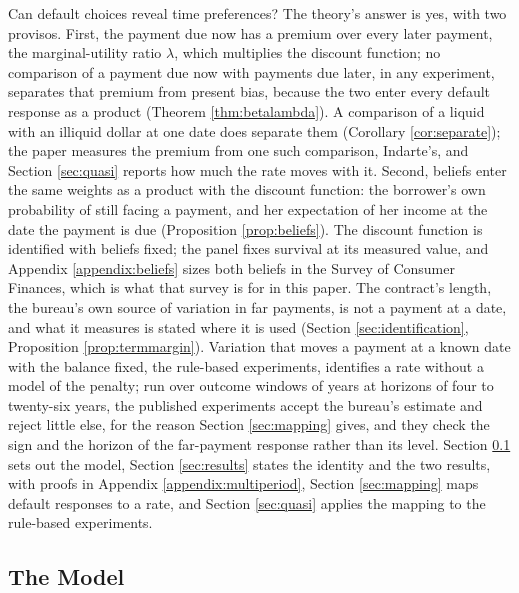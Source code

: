 Can default choices reveal time preferences? The theory's answer is yes, with two provisos. First, the payment due now has a premium over every later payment, the marginal-utility ratio $\lambda$, which multiplies the discount function; no comparison of a payment due now with payments due later, in any experiment, separates that premium from present bias, because the two enter every default response as a product (Theorem \ref{thm:betalambda}). A comparison of a liquid with an illiquid dollar at one date does separate them (Corollary \ref{cor:separate}); the paper measures the premium from one such comparison, Indarte's, and Section \ref{sec:quasi} reports how much the rate moves with it. Second, beliefs enter the same weights as a product with the discount function: the borrower's own probability of still facing a payment, and her expectation of her income at the date the payment is due (Proposition \ref{prop:beliefs}). The discount function is identified with beliefs fixed; the panel fixes survival at its measured value, and Appendix \ref{appendix:beliefs} sizes both beliefs in the Survey of Consumer Finances, which is what that survey is for in this paper. The contract's length, the bureau's own source of variation in far payments, is not a payment at a date, and what it measures is stated where it is used (Section \ref{sec:identification}, Proposition \ref{prop:termmargin}). Variation that moves a payment at a known date with the balance fixed, the rule-based experiments, identifies a rate without a model of the penalty; run over outcome windows of years at horizons of four to twenty-six years, the published experiments accept the bureau's estimate and reject little else, for the reason Section \ref{sec:mapping} gives, and they check the sign and the horizon of the far-payment response rather than its level. Section \ref{sec:model} sets out the model, Section \ref{sec:results} states the identity and the two results, with proofs in Appendix \ref{appendix:multiperiod}, Section \ref{sec:mapping} maps default responses to a rate, and Section \ref{sec:quasi} applies the mapping to the rule-based experiments.

\subsection{The Model}\label{sec:model}

